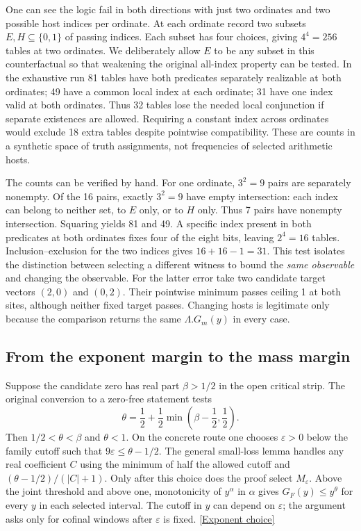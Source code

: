 \documentclass[12pt,letterpaper]{article}
\begin{document}
One can see the logic fail in both directions with just two ordinates and two possible host indices per ordinate. At each ordinate record two subsets \(E,H\subseteq\{0,1\}\) of passing indices. Each subset has four choices, giving \(4^4=256\) tables at two ordinates. We deliberately allow \(E\) to be any subset in this counterfactual so that weakening the original all-index property can be tested. In the exhaustive run 81 tables have both predicates separately realizable at both ordinates; 49 have a common local index at each ordinate; 31 have one index valid at both ordinates. Thus 32 tables lose the needed local conjunction if separate existences are allowed. Requiring a constant index across ordinates would exclude 18 extra tables despite pointwise compatibility. These are counts in a synthetic space of truth assignments, not frequencies of selected arithmetic hosts.

The counts can be verified by hand. For one ordinate, \(3^2=9\) pairs are separately nonempty. Of the 16 pairs, exactly \(3^2=9\) have empty intersection: each index can belong to neither set, to \(E\) only, or to \(H\) only. Thus 7 pairs have nonempty intersection. Squaring yields 81 and 49. A specific index present in both predicates at both ordinates fixes four of the eight bits, leaving \(2^4=16\) tables. Inclusion--exclusion for the two indices gives \(16+16-1=31\). This test isolates the distinction between selecting a different witness to bound the \emph{same observable} and changing the observable. For the latter error take two candidate target vectors \((2,0)\) and \((0,2)\). Their pointwise minimum passes ceiling 1 at both sites, although neither fixed target passes. Changing hosts is legitimate only because the comparison returns the same \(\Lambda.G_m(y)\) in every case.

\subsection{From the exponent margin to the mass margin}
Suppose the candidate zero has real part \(\beta>1/2\) in the open critical strip. The original conversion to a zero-free statement tests
\[
 \theta=\frac12+\frac12\min\!\left(\beta-\frac12,\frac12\right).
\]
Then \(1/2<\theta<\beta\) and \(\theta<1\). On the concrete route one chooses \(\varepsilon>0\) below the family cutoff such that \(9\varepsilon\le\theta-1/2\). The general small-loss lemma handles any real coefficient \(C\) using the minimum of half the allowed cutoff and \((\theta-1/2)/(|C|+1)\). Only after this choice does the proof select \(M_\varepsilon\). Above the joint threshold and above one, monotonicity of \(y^\alpha\) in \(\alpha\) gives \(G_F(y)\le y^\theta\) for every \(y\) in each selected interval. The cutoff in \(y\) can depend on \(\varepsilon\); the argument asks only for cofinal windows after \(\varepsilon\) is fixed. \href{https://github.com/nousentllc/riemann-hypothesis/blob/40e56bab026552e089d7afcfeff08d2defb9c005/src/Formalism/SharpRestriction/RamificationFrobenius/TotientGaloisClasses/TopWin.lean#L59-L81}{\textsf{[Exponent choice]}}
\end{document}
